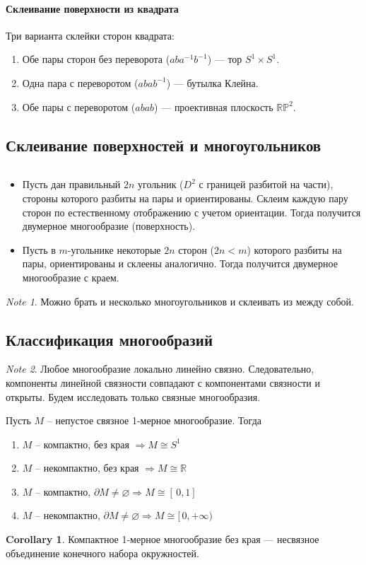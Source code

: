 \documentclass[11pt]{book}
\newcommand{\R}{\mathbb{R}}
\newcommand{\Pm}{\mathbb{P}}
\theoremstyle{definition}
\theoremstyle{plain}
\theoremstyle{plain}
\theoremstyle{definition}
\newtheorem*{cor}{Corollary}
\theoremstyle{remark}
\newtheorem*{note}{Note}
\begin{document}
\paragraph{Склеивание поверхности из квадрата}
Три варианта склейки сторон квадрата:
$ $
\begin{enumerate}
    \item Обе пары сторон без переворота ($ aba^{-1}b^{-1}$) --- тор $ S^{1}\times S^{1}$.
    \item Одна пара с переворотом ($ abab^{-1}$) --- бутылка Клейна.
    \item Обе пары с переворотом ($ abab$) --- проективная плоскость  $ \R\Pm^2$.
\end{enumerate}
\subsection{Склеивание поверхностей и многоугольников}
\begin{thm}
    $ $
    \begin{itemize}
	\item  Пусть дан правильный $ 2n$ угольник ($ D^{2}$ с границей разбитой на части), стороны которого разбиты на пары и ориентированы.
	    Склеим каждую пару сторон по естественному отображению с учетом ориентации.
	    Тогда получится двумерное многообразие (поверхность).
	\item Пусть в $ m$-угольнике некоторые $ 2n $ сторон ($ 2n < m$) которого разбиты на пары, ориентированы и склеены аналогично.
	    Тогда получится двумерное многообразие с краем.
    \end{itemize}
\end{thm}
\begin{note}
    Можно брать и несколько многоугольников и склеивать из между собой.
\end{note}
\subsection{Классификация многообразий}
\begin{note}
    Любое многообразие локально линейно связно. Следовательно, компоненты линейной связности совпадают с компонентами связности и открыты. Будем исследовать только связные многообразия.
\end{note}
\begin{thm}
    Пусть $ M $ -- непустое связное 1-мерное многообразие. Тогда
    \begin{enumerate}
	\item  $ M$ -- компактно, без края $\Longrightarrow   M \cong S^{1}$
	\item $ M$ -- некомпактно, без края $\Longrightarrow   M \cong \R$
	\item  $ M $ -- компактно, $ \partial M \ne \varnothing \Longrightarrow M \cong [\,0,1]$
	\item $ M$ -- некомпактно, $ \partial M \ne  \varnothing \Longrightarrow M \cong [\,0, +\infty)$
    \end{enumerate}
\end{thm}
\begin{cor}
    Компактное 1-мерное многообразие без края --- несвязное объединение конечного набора окружностей.
\end{cor}
\end{document}
